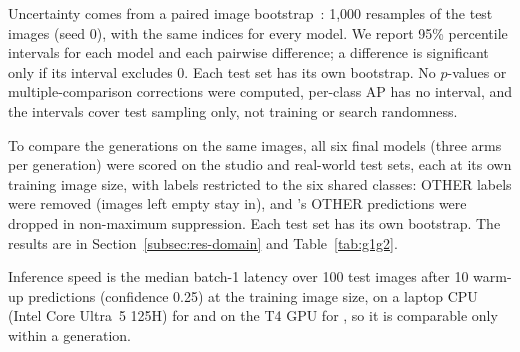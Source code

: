 Uncertainty comes from a paired image bootstrap~\cite{efron1993introduction}: 1,000 resamples of the test images (seed 0), with the same indices for every model. We report 95\% percentile intervals for each model and each pairwise difference; a difference is significant only if its interval excludes 0. Each \gentwo test set has its own bootstrap. No $p$-values or multiple-comparison corrections were computed, per-class AP has no interval, and the intervals cover test sampling only, not training or search randomness.

To compare the generations on the same images, all six final models (three arms per generation) were scored on the studio and real-world test sets, each at its own training image size, with labels restricted to the six shared classes: OTHER labels were removed (images left empty stay in), and \gentwo's OTHER predictions were dropped in non-maximum suppression. Each test set has its own bootstrap. The results are in Section~\ref{subsec:res-domain} and Table~\ref{tab:g1g2}.

Inference speed is the median batch-1 latency over 100 test images after 10 warm-up predictions (confidence 0.25) at the training image size, on a laptop CPU (Intel Core Ultra~5 125H) for \genone and on the T4 GPU for \gentwo, so it is comparable only within a generation.
